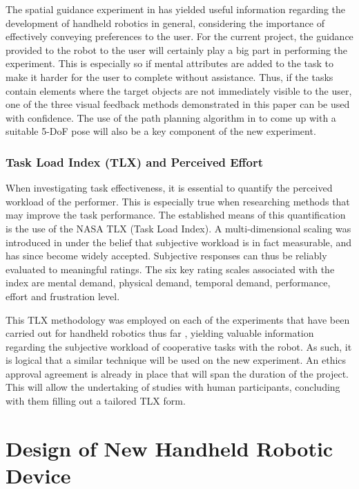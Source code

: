 \documentclass[11pt]{article}
\begin{document}
The spatial guidance experiment in \cite{GreggSmithFeedback} has yielded useful information regarding the development of handheld robotics in general, considering the importance of effectively conveying preferences to the user. For the current project, the guidance provided to the robot to the user will certainly play a big part in performing the experiment. This is especially so if mental attributes are added to the task to make it harder for the user to complete without assistance. Thus, if the tasks contain elements where the target objects are not immediately visible to the user, one of the three visual feedback methods demonstrated in this paper can be used with confidence. The use of the path planning algorithm in \cite{GreggSmithFeedback} to come up with a suitable 5-DoF pose will also be a key component of the new experiment.


\subsubsection{Task Load Index (TLX) and Perceived Effort}

When investigating task effectiveness, it is essential to quantify the perceived workload of the performer. This is especially true when researching methods that may improve the task performance. The established means of this quantification is the use of the NASA TLX (Task Load Index). A multi-dimensional scaling was introduced in \cite{hart1988} under the belief that subjective workload is in fact measurable, and has since become widely accepted. Subjective responses can thus be reliably evaluated to meaningful ratings. The six key rating scales associated with the index are mental demand, physical demand, temporal demand, performance, effort and frustration level. 

This TLX methodology was employed on each of the experiments that have been carried out for handheld robotics thus far \cite{GreggSmithDesign} \cite{GreggSmithFeedback}, yielding valuable information regarding the subjective workload of cooperative tasks with the robot. As such, it is logical that a similar technique will be used on the new experiment. An ethics approval agreement is already in place that will span the duration of the project. This will allow the undertaking of studies with human participants, concluding with them filling out a tailored TLX form. 
\pagebreak


\section{Design of New Handheld Robotic Device}
\end{document}
